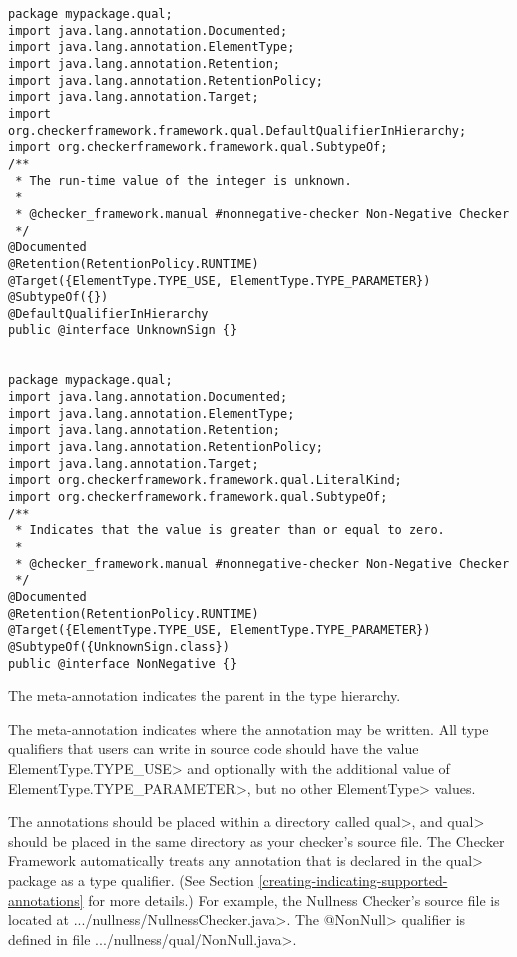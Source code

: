 \begin{Verbatim}
package mypackage.qual;
import java.lang.annotation.Documented;
import java.lang.annotation.ElementType;
import java.lang.annotation.Retention;
import java.lang.annotation.RetentionPolicy;
import java.lang.annotation.Target;
import org.checkerframework.framework.qual.DefaultQualifierInHierarchy;
import org.checkerframework.framework.qual.SubtypeOf;
/**
 * The run-time value of the integer is unknown.
 *
 * @checker_framework.manual #nonnegative-checker Non-Negative Checker
 */
@Documented
@Retention(RetentionPolicy.RUNTIME)
@Target({ElementType.TYPE_USE, ElementType.TYPE_PARAMETER})
@SubtypeOf({})
@DefaultQualifierInHierarchy
public @interface UnknownSign {}


package mypackage.qual;
import java.lang.annotation.Documented;
import java.lang.annotation.ElementType;
import java.lang.annotation.Retention;
import java.lang.annotation.RetentionPolicy;
import java.lang.annotation.Target;
import org.checkerframework.framework.qual.LiteralKind;
import org.checkerframework.framework.qual.SubtypeOf;
/**
 * Indicates that the value is greater than or equal to zero.
 *
 * @checker_framework.manual #nonnegative-checker Non-Negative Checker
 */
@Documented
@Retention(RetentionPolicy.RUNTIME)
@Target({ElementType.TYPE_USE, ElementType.TYPE_PARAMETER})
@SubtypeOf({UnknownSign.class})
public @interface NonNegative {}
\end{Verbatim}

The  meta-annotation
indicates the parent in the type hierarchy.

The 
meta-annotation indicates where the annotation
may be written. All type qualifiers that users can write in source code should
have the value \<ElementType.TYPE\_USE> and optionally with the additional value
of \<ElementType.TYPE\_PARAMETER>, but no other \<ElementType> values.

The annotations should be placed within a directory called \<qual>, and
\<qual> should be placed in the same directory as your checker's source file.
The Checker Framework automatically treats any annotation that
is declared in the \<qual> package as a type qualifier.
(See Section \ref{creating-indicating-supported-annotations} for more details.)
For example, the Nullness Checker's source file is located at
\<.../nullness/NullnessChecker.java>. The \<@NonNull> qualifier is defined in
file \<.../nullness/qual/NonNull.java>.

